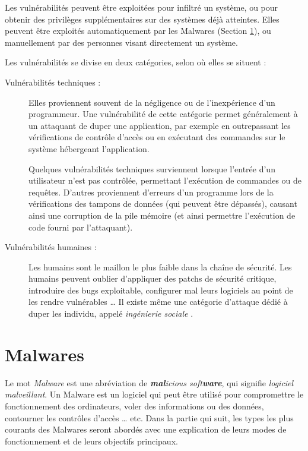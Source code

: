     Les vulnérabilités peuvent être exploitées pour infiltré un système, ou pour obtenir des privilèges supplémentaires
    sur des systèmes déjà atteintes. Elles peuvent être exploités automatiquement par les Malwares 
    (Section \ref{malwares}), ou manuellement par des personnes visant directement un système.

    Les vulnérabilités se divise en deux catégories, selon où elles se situent :
    
    \begin{description}
        \item[Vulnérabilités techniques :] Elles proviennent souvent de la négligence ou de l'inexpérience d'un 
            programmeur. Une vulnérabilité de cette catégorie permet généralement à un attaquant de duper 
            une application, par exemple en outrepassant les vérifications de contrôle d'accès ou en exécutant
            des commandes sur le système hébergeant l'application.

            Quelques vulnérabilités techniques surviennent lorsque l'entrée d'un utilisateur n'est pas contrôlée,
            permettant l'exécution de commandes ou de requêtes. D'autres proviennent d'erreurs d'un programme
            lors de la vérifications des tampons de données (qui peuvent être dépassés), 
            causant ainsi une corruption de la pile mémoire
            (et ainsi permettre l'exécution de code fourni par l'attaquant). \cite{vulnerabilites}

        \item[Vulnérabilités humaines :] Les humains sont le maillon le plus faible dans la chaîne de sécurité.
            Les humains peuvent oublier d'appliquer des patchs de sécurité critique, introduire des bugs
            exploitable, configurer mal leurs logiciels au point de les rendre vulnérables \ldots{}
            Il existe même une catégorie d'attaque dédié à duper les individu, appelé \emph{ingénierie sociale} 
            \cite{bases_hacking}.
    \end{description}

\section{Malwares} \label{malwares}
    Le mot \emph{Malware} est une abréviation de \emph{\textbf{mal}icious soft\textbf{ware}}, qui signifie 
    \emph{logiciel malveillant}. Un Malware est un logiciel qui peut être utilisé pour compromettre le
    fonctionnement des ordinateurs, voler des informations ou des données, contourner les contrôles d'accès
    \ldots{} etc. Dans la partie qui suit, les types les plus courants des Malwares seront abordés avec une explication 
    de leurs modes de fonctionnement et de leurs objectifs principaux. \cite{malware_types}%

